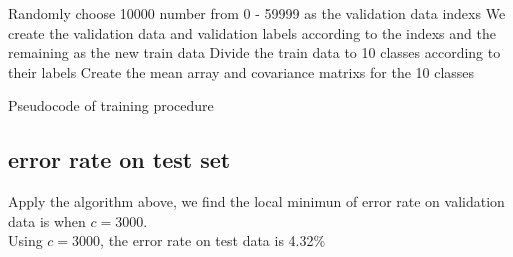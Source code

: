 \documentclass{article}
\begin{document}
\begin{algorithm}[H]
 Randomly choose 10000 number from 0 - 59999 as the validation data indexs\;
 We create the validation data and validation labels according to the indexs and the remaining as the new train data\;
 Divide the train data to 10 classes according to their labels\;
 Create the mean array and covariance matrixs for the 10 classes\;
 \caption{Pseudocode of training procedure}
\end{algorithm}

\subsection{error rate on test set}
Apply the algorithm above, we find the local minimun of error rate on validation data is when $c = 3000$.\\
Using $c = 3000$, the error rate on test data is 4.32\%
\end{document}
